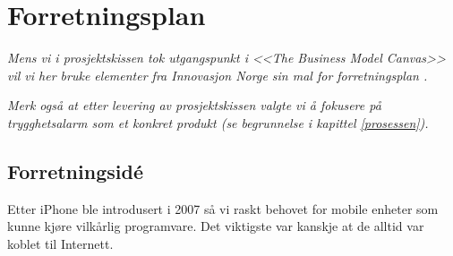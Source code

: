 %
%
%
%





\chapter{Forretningsplan}

\textit{Mens vi i prosjektskissen tok utgangspunkt i \textit{<<The Business
Model Canvas>>} \cite{osterwalder} vil vi her bruke elementer fra Innovasjon
Norge sin mal for forretningsplan \cite{innovasjon.norge}.}

\textit{Merk også at etter levering av prosjektskissen valgte vi å fokusere på
trygghetsalarm som et konkret produkt (se begrunnelse i kapittel
\vref{prosessen}).}

\section{Forretningsidé}

Etter iPhone ble introdusert i 2007 så vi raskt behovet for mobile enheter som
kunne kjøre vilkårlig programvare. Det viktigste var kanskje at de alltid var
koblet til Internett.


